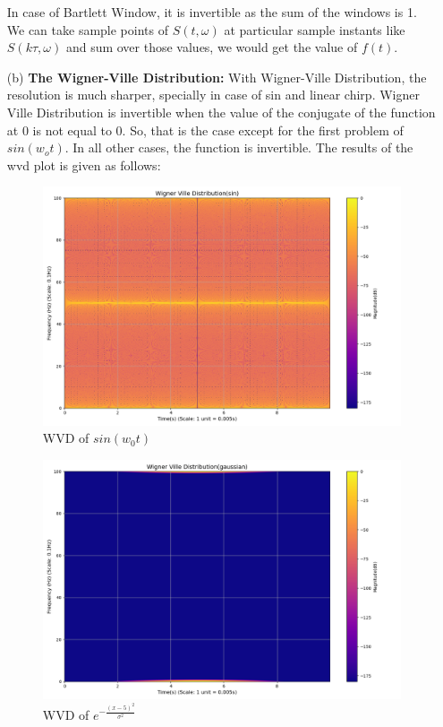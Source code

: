 \documentclass[12pt,a4paper,onecolumn]{exam}
\begin{document}
\begin{solution}
\begin{itemize}
    In case of Bartlett Window, it is invertible as the sum of the windows is 1. We can take sample points of $S(t,\omega)$ at particular sample instants like $S(k\tau, \omega)$ and sum over those values, we would get the value of $f(t)$.    
    \item[(b)] \textbf{The Wigner-Ville Distribution:}
    With Wigner-Ville Distribution, the resolution is much sharper, specially in case of sin and linear chirp. Wigner Ville Distribution is invertible when the value of the conjugate of the function at 0 is not equal to 0. So, that is the case except for the first problem of $sin(w_ot)$. In all other cases, the function is invertible. The results of the wvd plot is given as follows: 

        \begin{figure}[H]
        \centering
        \includegraphics[scale = 0.35]{sin_wvd.png}
        \caption{WVD of $sin(w_0t)$}
        \label{fig:25}
        \end{figure}

        \begin{figure}[H]
        \centering
        \includegraphics[scale = 0.35]{gaussian_wvd.png}
        \caption{WVD of $e^{-\frac{(x-5)^2}{\sigma^2}}$ }
        \label{fig:26}
        \end{figure}


\end{itemize}
\end{solution}
\end{document}
